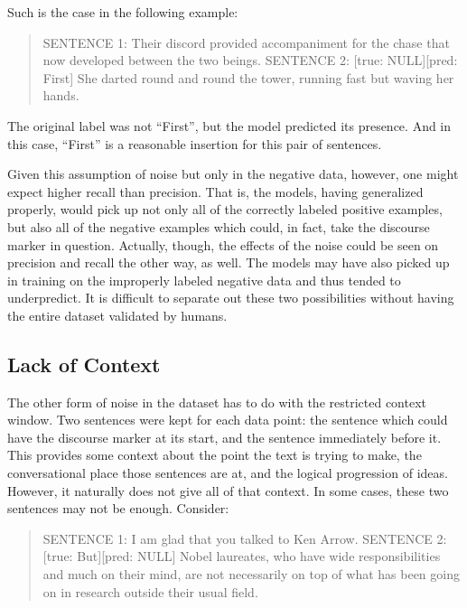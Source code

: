 Such is the case in the following example:

\begin{quote}
\small{SENTENCE 1:} \quad Their discord provided accompaniment for the chase that now developed between the two beings. \linebreak
\small{SENTENCE 2:} \quad \small{[true: NULL][pred: First]} She darted round and round the tower, running fast but waving her hands. 
\end{quote}

The original label was not ``First'', but the model predicted its presence. And in this case, ``First'' is a reasonable insertion for this pair of sentences.

Given this assumption of noise but only in the negative data, however, one might expect higher recall than precision. That is, the models, having generalized properly, would pick up not only all of the correctly labeled positive examples, but also all of the negative examples which could, in fact, take the discourse marker in question. Actually, though, the effects of the noise could be seen on precision and recall the other way, as well. The models may have also picked up in training on the improperly labeled negative data and thus tended to underpredict. It is difficult to separate out these two possibilities without having the entire dataset validated by humans.

\subsection{Lack of Context}

The other form of noise in the dataset has to do with the restricted context window. Two sentences were kept for each data point: the sentence which could have the discourse marker at its start, and the sentence immediately before it. This provides some context about the point the text is trying to make, the conversational place those sentences are at, and the logical progression of ideas. However, it naturally does not give all of that context. In some cases, these two sentences may not be enough. Consider:

\begin{quote}
\small{SENTENCE 1:} \quad I am glad that you talked to Ken Arrow.
\linebreak
\small{SENTENCE 2:} \quad \small{[true: But][pred: NULL]} Nobel laureates, who have wide responsibilities and much on their mind, are not necessarily on top of what has been going on in research outside their usual field.
\end{quote}

